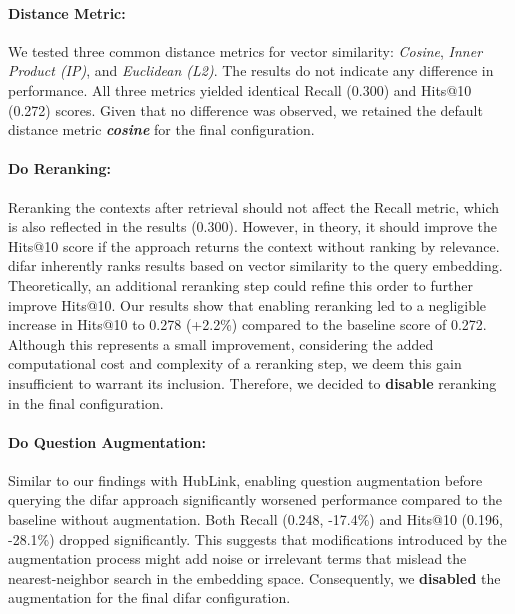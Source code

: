 \paragraph{Distance Metric:} 
We tested three common distance metrics for vector similarity: \emph{Cosine}, \emph{Inner Product (IP)}, and \emph{Euclidean (L2)}. The results do not indicate any difference in performance. All three metrics yielded identical Recall (0.300) and Hits@10 (0.272) scores. Given that no difference was observed, we retained the default distance metric \textbf{\emph{cosine}} for the final configuration.

\paragraph{Do Reranking:} 
Reranking the contexts after retrieval should not affect the Recall metric, which is also reflected in the results (0.300). However, in theory, it should improve the Hits@10 score if the approach returns the context without ranking by relevance. \gls{difar} inherently ranks results based on vector similarity to the query embedding. Theoretically, an additional reranking step could refine this order to further improve Hits@10. Our results show that enabling reranking led to a negligible increase in Hits@10 to 0.278 (+2.2\%) compared to the baseline score of 0.272. Although this represents a small improvement, considering the added computational cost and complexity of a reranking step, we deem this gain insufficient to warrant its inclusion. Therefore, we decided to \textbf{disable} reranking in the final configuration.

\paragraph{Do Question Augmentation:} 
Similar to our findings with HubLink, enabling question augmentation before querying the \gls{difar} approach significantly worsened performance compared to the baseline without augmentation. Both Recall (0.248, -17.4\%) and Hits@10 (0.196, -28.1\%) dropped significantly. This suggests that modifications introduced by the augmentation process might add noise or irrelevant terms that mislead the nearest-neighbor search in the embedding space. Consequently, we \textbf{disabled} the augmentation for the final \gls{difar} configuration.

